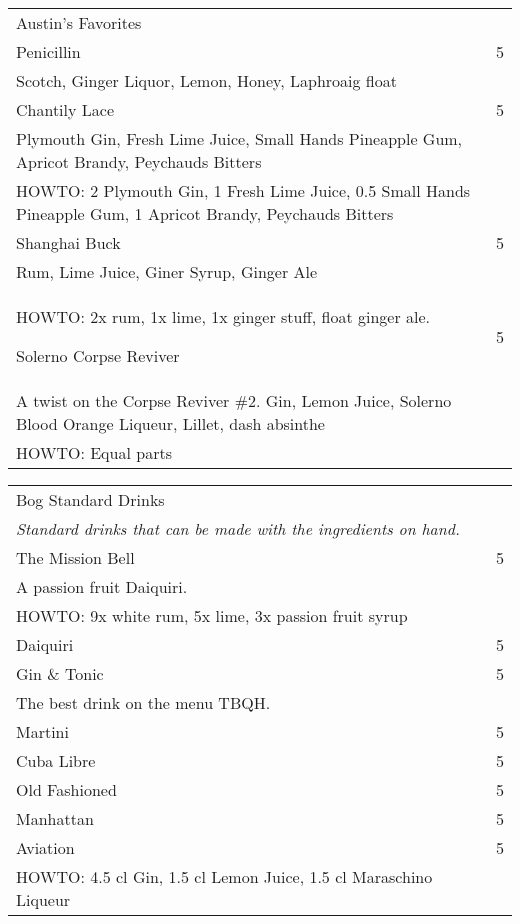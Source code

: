 \documentclass[12pt]{article}
\makeatletter
\newcommand*\ColText[1]{\textcolor{Goldenrod3}{#1}}
\newenvironment{Group}[1]
  {\noindent\begin{tabular*}{\textwidth}{@{}p{.8\linewidth}@{\extracolsep{\fill}}r@{}}
    {\fontsize{24}{29}\selectfont\ColText{#1}}\\[0.8em]}
  {\end{tabular*}}
\newcommand*\Entry[1]{%
  \sffamily#1 & 5}
\newcommand*\Expl[1]{
  \hspace*{1em}\footnotesize #1}
\newcommand*\HowTo[1]{
  HOWTO: \hspace*{1em}\footnotesize #1
}
\makeatother
\begin{document}
\begin{Group}{Austin's Favorites}

\Entry{Penicillin} \\
\Expl{Scotch, Ginger Liquor, Lemon, Honey, Laphroaig float} \\

\Entry{Chantily Lace} \\
\Expl{Plymouth Gin, Fresh Lime Juice, Small Hands Pineapple Gum, Apricot Brandy, Peychauds Bitters} \\
\HowTo{2 Plymouth Gin, 1 Fresh Lime Juice, 0.5 Small Hands Pineapple Gum, 1 Apricot Brandy, Peychauds Bitters} \\

\Entry{Shanghai Buck} \\
\Expl{Rum, Lime Juice, Giner Syrup, Ginger Ale} \\
\HowTo{2x rum, 1x lime, 1x ginger stuff, float ginger ale.}

\Entry{Solerno Corpse Reviver} \\
\Expl{A twist on the Corpse Reviver \#2. Gin, Lemon Juice, Solerno Blood Orange Liqueur, Lillet, dash absinthe} \\
\HowTo{Equal parts} \\

\end{Group}

\vfill

\begin{Group}{Bog Standard Drinks}
\emph{Standard drinks that can be made with the ingredients on hand.} \\

\Entry{The Mission Bell} \\
\Expl{A passion fruit Daiquiri.} \\
\HowTo{9x white rum, 5x lime, 3x passion fruit syrup} \\

\Entry{Daiquiri} \\
\Entry{Gin \& Tonic} \\
\Expl{The best drink on the menu TBQH.} \\
\Entry{Martini} \\
\Entry{Cuba Libre} \\
\Entry{Old Fashioned} \\
\Entry{Manhattan} \\

\Entry{Aviation} \\
\HowTo{4.5 cl Gin, 1.5 cl Lemon Juice, 1.5 cl Maraschino Liqueur} \\

\end{Group}
\end{document}
